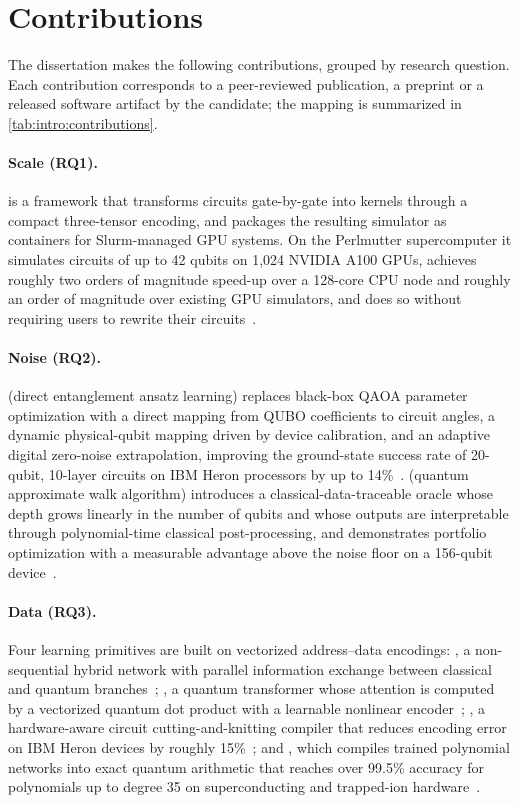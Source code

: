\section{Contributions}\label{sec:intro:contributions}

The dissertation makes the following contributions, grouped by research question. Each contribution corresponds to a peer-reviewed publication, a preprint or a released software artifact by the candidate; the mapping is summarized in \cref{tab:intro:contributions}.

\paragraph{Scale (RQ1).}
\qgear{} is a framework that transforms \qiskit{} circuits gate-by-gate into \cudaq{} kernels through a compact three-tensor encoding, and packages the resulting simulator as containers for Slurm-managed GPU systems. On the Perlmutter supercomputer it simulates circuits of up to 42 qubits on 1,024 NVIDIA A100 GPUs, achieves roughly two orders of magnitude speed-up over a 128-core CPU node and roughly an order of magnitude over existing GPU simulators, and does so without requiring users to rewrite their circuits~\cite{guo2025qgear}.

\paragraph{Noise (RQ2).}
\deal{} (direct entanglement ansatz learning) replaces black-box QAOA parameter optimization with a direct mapping from QUBO coefficients to circuit angles, a dynamic physical-qubit mapping driven by device calibration, and an adaptive digital zero-noise extrapolation, improving the ground-state success rate of 20-qubit, 10-layer circuits on IBM Heron processors by up to 14\%~\cite{guo2025deal}. \qawa{} (quantum approximate walk algorithm) introduces a classical-data-traceable oracle whose depth grows linearly in the number of qubits and whose outputs are interpretable through polynomial-time classical post-processing, and demonstrates portfolio optimization with a measurable advantage above the noise floor on a 156-qubit device~\cite{guo2025qawa}.

\paragraph{Data (RQ3).}
Four learning primitives are built on vectorized address--data encodings: \qpie{}, a non-sequential hybrid network with parallel information exchange between classical and quantum branches~\cite{guo2025qpie}; \vqt{}, a quantum transformer whose attention is computed by a vectorized quantum dot product with a learnable nonlinear encoder~\cite{guo2025vqt}; \shardq{}, a hardware-aware circuit cutting-and-knitting compiler that reduces encoding error on IBM Heron devices by roughly 15\%~\cite{guo2025shardq}; and \nnqa{}, which compiles trained polynomial networks into exact quantum arithmetic that reaches over 99.5\% accuracy for polynomials up to degree 35 on superconducting and trapped-ion hardware~\cite{guo2026nnqa}.

